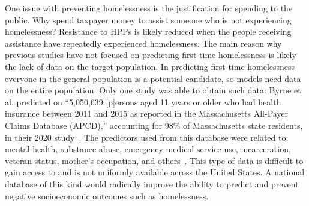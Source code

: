 \documentclass[10pt,letterpaper]{article}
\begin{document}
One issue with preventing homelessness is the justification for spending to the public. Why spend taxpayer money to assist someone who is not experiencing homelessness? Resistance to HPPs is likely reduced when the people receiving assistance have repeatedly experienced homelessness. The main reason why previous studies have not focused on predicting first-time homelessness is likely the lack of data on the target population. In predicting first-time homelessness everyone in the general population is a potential candidate, so models need data on the entire population. Only one study was able to obtain such data: Byrne et al. predicted on ``5,050,639 [p]ersons aged 11 years or older who had health insurance between 2011 and 2015 as reported in the Massachusetts All-Payer Claims Database (APCD),'' accounting for 98\% of Massachusetts state residents, in their 2020 study~\cite{byrne2020classification}. The predictors used from this database were related to: mental health, substance abuse, emergency medical service use, incarceration, veteran status, mother's occupation, and others~\cite{byrne2020classification}. This type of data is difficult to gain access to and is not uniformly available across the United States. A national database of this kind would radically improve the ability to predict and prevent negative socioeconomic outcomes such as homelessness.
\end{document}
